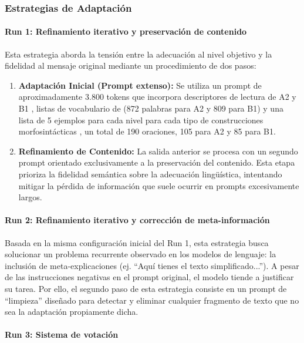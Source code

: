\subsubsection*{Estrategias de Adaptación}

\paragraph {Run 1: Refinamiento iterativo y preservación de contenido}

Esta estrategia aborda la tensión entre la adecuación al nivel objetivo y la fidelidad al mensaje original mediante un procedimiento de dos pasos:

\begin{enumerate}
\item \textbf{Adaptación Inicial (Prompt extenso):} Se utiliza un prompt de aproximadamente 3.800 tokens que incorpora descriptores de lectura de A2 y B1 \parencite{CouncilEurope2020}, listas de vocabulario de \parencite{Oxford3000} (872 palabras para A2 y 809 para B1) y una lista de 5 ejemplos para cada nivel para cada tipo de construcciones morfosintácticas \parencite{North2010}, un total de 190 oraciones, 105 para A2 y 85 para B1.
\item \textbf{Refinamiento de Contenido:} La salida anterior se procesa con un segundo prompt orientado exclusivamente a la preservación del contenido. Esta etapa prioriza la fidelidad semántica sobre la adecuación lingüística, intentando mitigar la pérdida de información que suele ocurrir en prompts excesivamente largos.
\end{enumerate}

\paragraph {Run 2: Refinamiento iterativo y corrección de meta-información}
Basada en la misma configuración inicial del Run 1, esta estrategia busca solucionar un problema recurrente observado en los modelos de lenguaje: la inclusión de meta-explicaciones (ej. ``Aquí tienes el texto simplificado...''). A pesar de las instrucciones negativas en el prompt original, el modelo tiende a justificar su tarea. Por ello, el segundo paso de esta estrategia consiste en un prompt de ``limpieza'' diseñado para detectar y eliminar cualquier fragmento de texto que no sea la adaptación propiamente dicha.

\paragraph {Run 3: Sistema de votación}

